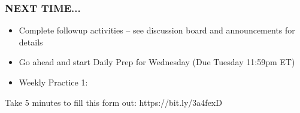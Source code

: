 \documentclass{beamer}
\begin{document}
\begin{frame}
    \frametitle{NEXT TIME...}

    \begin{itemize}
        \item Complete followup activities -- see discussion board and announcements for details 
        \item Go ahead and start Daily Prep for Wednesday (Due Tuesday 11:59pm ET)
        \item Weekly Practice 1: 
    \end{itemize}

Take 5 minutes to fill this form out: https://bit.ly/3a4fexD

\end{frame}
\end{document}
